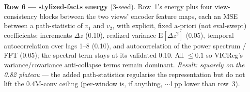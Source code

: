 \documentclass[10pt,a4paper]{article}
\begin{document}
\medskip

\noindent\textbf{Row 6 --- stylized-facts energy} (3-seed). Row~1's energy plus four
view-consistency blocks between the two views' encoder feature maps, each an MSE between a
path-statistic of $v_1$ and $v_2$, with explicit, fixed a-priori (not eval-swept) coefficients:
increments $\Delta z$ (0.10), realized variance $\mathrm{E}[\Delta z^2]$ (0.05), temporal
autocorrelation over lags 1--8 (0.10), and autocorrelation of the power spectrum / FFT (0.05); the
spectral term stays at its validated 0.10. All $\le0.1$ so VICReg's variance/covariance
anti-collapse terms remain dominant. \emph{Result: squarely on the 0.82 plateau} --- the added
path-statistics regularise the representation but do not lift the 0.4M-conv ceiling (per-window is,
if anything, $\sim$1\,pp lower than row~3).
\end{document}
